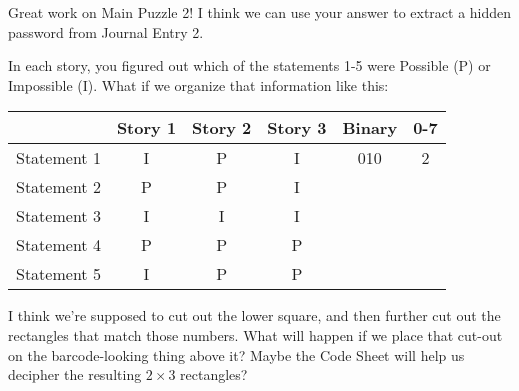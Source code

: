 Great work on Main Puzzle 2! I think we can use your answer
to extract a hidden password from Journal Entry 2.

In each story, you figured out which of the statements 1-5 were Possible (P)
or Impossible (I). What if we organize that information like this:

\begin{center}
\begin{tabular}{c|ccc|cc}
& Story 1 & Story 2 & Story 3 & Binary & 0-7 \\\hline
Statement 1 & I & P & I & 010 & 2 \\
Statement 2 & P & P & I \\ %
Statement 3 & I & I & I \\ %
Statement 4 & P & P & P \\ %
Statement 5 & I & P & P %
\end{tabular}
\end{center}

I think we're supposed to cut out the lower square, and then further
cut out the rectangles that match those numbers. What will happen
if we place that cut-out on the barcode-looking thing above it?
Maybe the Code Sheet will help us decipher the resulting \(2\times 3\)
rectangles?
